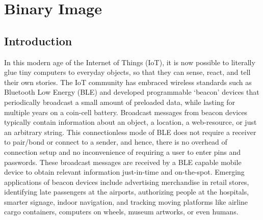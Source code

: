 \chapter{Binary Image}

\section{Introduction}
\label{sec:intro}


In this modern age of the Internet of Things (IoT), it is now possible to literally glue tiny computers to everyday objects, so that they can sense, react, and tell their own stories. The IoT community has embraced wireless standards such as Bluetooth Low Energy (BLE) and developed programmable `beacon' devices that periodically broadcast a small amount of preloaded data, while lasting for multiple years on a coin-cell battery. Broadcast messages from beacon devices typically contain information about an object, a location, a web-resource, or just an arbitrary string. This connectionless mode of BLE does not require a receiver to pair/bond or connect to a sender, and hence, there is no overhead of connection setup and no inconvenience of requiring a user to enter pins and passwords. These broadcast messages are received by a BLE capable mobile device to obtain relevant information just-in-time and on-the-spot.  Emerging applications of beacon devices include advertising merchandise in retail stores, identifying late passengers at the airports, authorizing people at the hospitals, smarter signage, indoor navigation, and tracking moving platforms like airline cargo containers, computers on wheels, museum artworks, or even humans.

